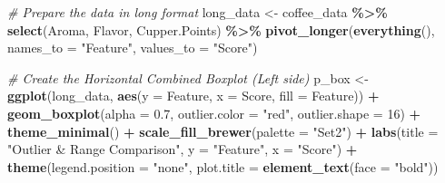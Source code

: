 \documentclass[
]{article}
\newenvironment{Shaded}{\begin{snugshade}}{\end{snugshade}}
\newcommand{\AttributeTok}[1]{\textcolor[rgb]{0.13,0.29,0.53}{#1}}
\newcommand{\CommentTok}[1]{\textcolor[rgb]{0.56,0.35,0.01}{\textit{#1}}}
\newcommand{\DecValTok}[1]{\textcolor[rgb]{0.00,0.00,0.81}{#1}}
\newcommand{\FloatTok}[1]{\textcolor[rgb]{0.00,0.00,0.81}{#1}}
\newcommand{\FunctionTok}[1]{\textcolor[rgb]{0.13,0.29,0.53}{\textbf{#1}}}
\newcommand{\NormalTok}[1]{#1}
\newcommand{\OtherTok}[1]{\textcolor[rgb]{0.56,0.35,0.01}{#1}}
\newcommand{\SpecialCharTok}[1]{\textcolor[rgb]{0.81,0.36,0.00}{\textbf{#1}}}
\newcommand{\StringTok}[1]{\textcolor[rgb]{0.31,0.60,0.02}{#1}}
\begin{document}
\begin{Shaded}
\begin{Highlighting}[]
\CommentTok{\# Prepare the data in \textquotesingle{}long\textquotesingle{} format}
\NormalTok{long\_data }\OtherTok{\textless{}{-}}\NormalTok{ coffee\_data }\SpecialCharTok{\%\textgreater{}\%}
  \FunctionTok{select}\NormalTok{(Aroma, Flavor, Cupper.Points) }\SpecialCharTok{\%\textgreater{}\%}
  \FunctionTok{pivot\_longer}\NormalTok{(}\FunctionTok{everything}\NormalTok{(), }\AttributeTok{names\_to =} \StringTok{"Feature"}\NormalTok{, }\AttributeTok{values\_to =} \StringTok{"Score"}\NormalTok{)}

\CommentTok{\# Create the Horizontal Combined Boxplot (Left side)}
\NormalTok{p\_box }\OtherTok{\textless{}{-}} \FunctionTok{ggplot}\NormalTok{(long\_data, }\FunctionTok{aes}\NormalTok{(}\AttributeTok{y =}\NormalTok{ Feature, }\AttributeTok{x =}\NormalTok{ Score, }\AttributeTok{fill =}\NormalTok{ Feature)) }\SpecialCharTok{+}
  \FunctionTok{geom\_boxplot}\NormalTok{(}\AttributeTok{alpha =} \FloatTok{0.7}\NormalTok{, }\AttributeTok{outlier.color =} \StringTok{"red"}\NormalTok{, }\AttributeTok{outlier.shape =} \DecValTok{16}\NormalTok{) }\SpecialCharTok{+}
  \FunctionTok{theme\_minimal}\NormalTok{() }\SpecialCharTok{+}
  \FunctionTok{scale\_fill\_brewer}\NormalTok{(}\AttributeTok{palette =} \StringTok{"Set2"}\NormalTok{) }\SpecialCharTok{+}
  \FunctionTok{labs}\NormalTok{(}\AttributeTok{title =} \StringTok{"Outlier \& Range Comparison"}\NormalTok{,}
       \AttributeTok{y =} \StringTok{"Feature"}\NormalTok{, }\AttributeTok{x =} \StringTok{"Score"}\NormalTok{) }\SpecialCharTok{+}
  \FunctionTok{theme}\NormalTok{(}\AttributeTok{legend.position =} \StringTok{"none"}\NormalTok{,}
        \AttributeTok{plot.title =} \FunctionTok{element\_text}\NormalTok{(}\AttributeTok{face =} \StringTok{"bold"}\NormalTok{))}


\end{Highlighting}
\end{Shaded}
\end{document}
